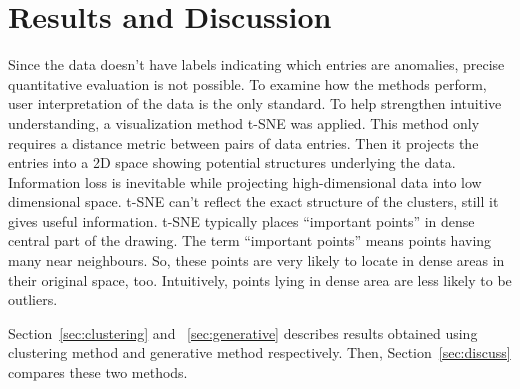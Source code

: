 \chapter{Results and Discussion}
\label{chapter:results}
Since the data doesn't have labels indicating which entries are anomalies, precise quantitative evaluation is not possible. To examine how the methods perform, user interpretation of the data is the only standard. To help strengthen intuitive understanding, a visualization method t-SNE\cite{maaten2008visualizing} was applied. This method only requires a distance metric between pairs of data entries. Then it projects the entries into a 2D space showing potential structures underlying the data. Information loss is inevitable while projecting high-dimensional data into low dimensional space. t-SNE can't reflect the exact structure of the clusters, still it gives useful information. t-SNE typically places ``important points'' in dense central part of the drawing. The term ``important points'' means points having many near neighbours. So, these points are very likely to locate in dense areas in their original space, too. Intuitively, points lying in dense area are less likely to be outliers. 

Section~\ref{sec:clustering} and ~\ref{sec:generative} describes results obtained using clustering method and generative method respectively. Then, Section~\ref{sec:discuss} compares these two methods.
